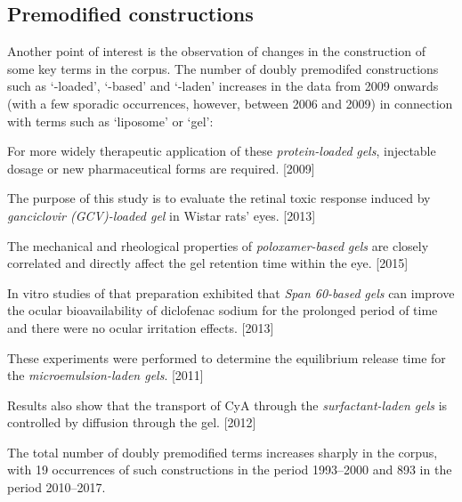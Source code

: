 \documentclass[output=paper]{langscibook}
\begin{document}
\subsection{Premodified constructions} %

Another point of interest is the observation of changes in the construction of some key terms in the corpus. The number of doubly premodifed constructions such as ‘-loaded’, ‘-based’ and ‘-laden’ increases in the data from 2009 onwards (with a few sporadic occurrences, however, between 2006 and 2009) in connection with terms such as ‘liposome’ or ‘gel’:

\ea%
    \label{ex:key:5}
         For more widely therapeutic application of these \textit{protein-loaded} \textit{gels}, injectable dosage or new pharmaceutical forms are required. [2009]
\z

\ea%
    \label{ex:key:6}
         The purpose of this study is to evaluate the retinal toxic response induced by \textit{ganciclovir (GCV)-loaded gel} in Wistar rats’ eyes. [2013]
\z

\ea%
    \label{ex:key:7}
         The mechanical and rheological properties of \textit{poloxamer-based} \textit{gels} are closely correlated and directly affect the gel retention time within the eye. [2015]
\z

\ea%
    \label{ex:key:8}
         In vitro studies of that preparation exhibited that \textit{Span 60-based} \textit{gels} can improve the ocular bioavailability of diclofenac sodium for the prolonged period of time and there were no ocular irritation effects. [2013]
\z

\ea%
    \label{ex:key:9}
         These experiments were performed to determine the equilibrium release time for the \textit{microemulsion-laden gels}. [2011]
\z

\ea%
    \label{ex:key:10}
         Results also show that the transport of CyA through the \textit{surfactant-laden gels} is controlled by diffusion through the gel. [2012]
\z

The total number of doubly premodified terms increases sharply in the corpus, with 19 occurrences of such constructions in the period 1993–2000 and 893 in the period 2010–2017.
\end{document}
